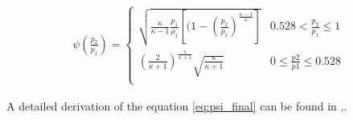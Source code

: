 \begin{align}
\psi\left(\frac{p_2}{p_1}\right) = 
    \begin{cases}
    \sqrt{\frac{\kappa}{\kappa-1} \frac{p_1}{\rho_1} 
    \left[(1-\left(\frac{p_2}{p_1}\right)^\frac{\kappa-1}{\kappa}\right]}
    & 0.528 <\frac{p_2}{p_1} \le 1 \\
    \left(\frac{2}{\kappa +1}\right)^{\frac{1}{\kappa+1}}
    \sqrt{\frac{\kappa}{\kappa +1}} & 0 \le \frac{p2}{p1} \le 0.528\\
    \end{cases}
\label{eq:psi_final}
\end{align}

A detailed derivation of the equation \ref{eq:psi_final} can be found in
\cite{isermann},\cite{}.




